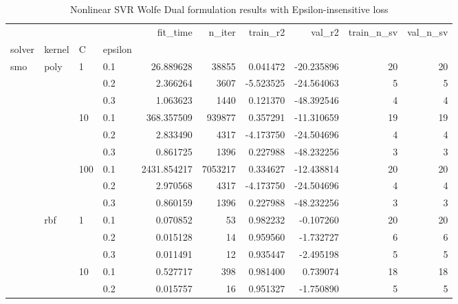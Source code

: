 \begin{table}[H]
\centering
\caption{Nonlinear SVR Wolfe Dual formulation results with Epsilon-insensitive loss}
\label{nonlinear_dual_svr_cv_results}
\begin{tabular}{llllrrrrrr}
\toprule
       &     &     &     &     fit\_time &    n\_iter &  train\_r2 &     val\_r2 &  train\_n\_sv &  val\_n\_sv \\
solver & kernel & C & epsilon &              &           &           &            &             &           \\
\midrule
smo & poly & 1   & 0.1 &    26.889628 &     38855 &  0.041472 & -20.235896 &          20 &        20 \\
       &     &     & 0.2 &     2.366264 &      3607 & -5.523525 & -24.564063 &           5 &         5 \\
       &     &     & 0.3 &     1.063623 &      1440 &  0.121370 & -48.392546 &           4 &         4 \\
       &     & 10  & 0.1 &   368.357509 &    939877 &  0.357291 & -11.310659 &          19 &        19 \\
       &     &     & 0.2 &     2.833490 &      4317 & -4.173750 & -24.504696 &           4 &         4 \\
       &     &     & 0.3 &     0.861725 &      1396 &  0.227988 & -48.232256 &           3 &         3 \\
       &     & 100 & 0.1 &  2431.854217 &   7053217 &  0.334627 & -12.438814 &          20 &        20 \\
       &     &     & 0.2 &     2.970568 &      4317 & -4.173750 & -24.504696 &           4 &         4 \\
       &     &     & 0.3 &     0.860159 &      1396 &  0.227988 & -48.232256 &           3 &         3 \\
       & rbf & 1   & 0.1 &     0.070852 &        53 &  0.982232 &  -0.107260 &          20 &        20 \\
       &     &     & 0.2 &     0.015128 &        14 &  0.959560 &  -1.732727 &           6 &         6 \\
       &     &     & 0.3 &     0.011491 &        12 &  0.935447 &  -2.495198 &           5 &         5 \\
       &     & 10  & 0.1 &     0.527717 &       398 &  0.981400 &   0.739074 &          18 &        18 \\
       &     &     & 0.2 &     0.015757 &        16 &  0.951327 &  -1.750890 &           5 &         5 \\

\end{tabular}
\end{table}
